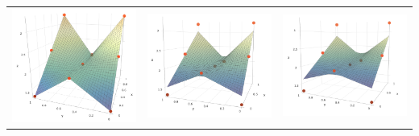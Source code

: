 \documentclass[11pt,margin=1in]{article}
\begin{document}
\begin{table}[!htbp]
  \centering
  \begin{tabular}{ccc}
    \includegraphics[width=5cm]{Linear_Box_Mesh} & \includegraphics[width=5cm]{Lin-1-1} & \includegraphics[width=5cm]{Lin-1-2} \\
  \end{tabular}
\end{table}  
\end{document}
